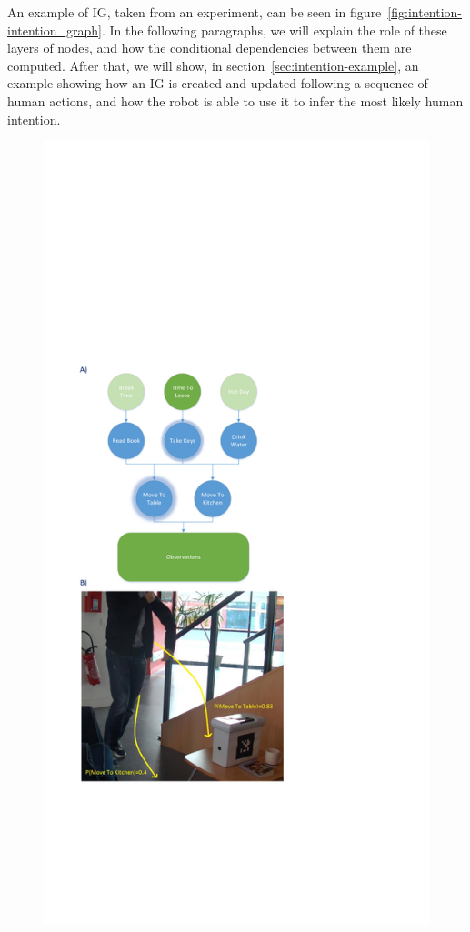 An example of IG, taken from an experiment, can be seen in figure~\ref{fig:intention-intention_graph}. In the following paragraphs, we will explain the role of these layers of nodes, and how the conditional dependencies between them are computed.  After that, we will show, in section~\ref{sec:intention-example}, an example showing how an IG is created and updated following a sequence of human actions, and how the robot is able to use it to infer the most likely human intention.

 \begin{figure}[ht!]
	\centering
	\includegraphics[trim={2cm 11cm 11cm 17cm},clip,scale=0.45]{img/observer/cookieScenario.pdf}

\end{figure}
